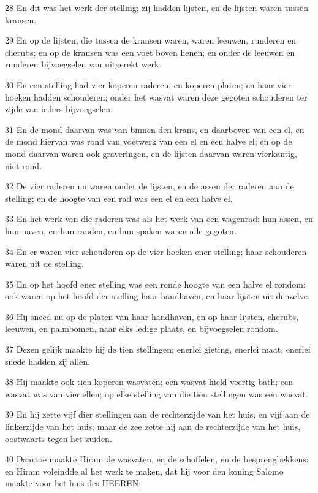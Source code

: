 \par 28 En dit was het werk der stelling; zij hadden lijsten, en de lijsten waren tussen kransen.
\par 29 En op de lijsten, die tussen de kransen waren, waren leeuwen, runderen en cherubs; en op de kransen was een voet boven henen; en onder de leeuwen en runderen bijvoegselen van uitgerekt werk.
\par 30 En een stelling had vier koperen raderen, en koperen platen; en haar vier hoeken hadden schouderen; onder het wasvat waren deze gegoten schouderen ter zijde van ieders bijvoegselen.
\par 31 En de mond daarvan was van binnen den krans, en daarboven van een el, en de mond hiervan was rond van voetwerk van een el en een halve el; en op de mond daarvan waren ook graveringen, en de lijsten daarvan waren vierkantig, niet rond.
\par 32 De vier raderen nu waren onder de lijsten, en de assen der raderen aan de stelling; en de hoogte van een rad was een el en een halve el.
\par 33 En het werk van die raderen was als het werk van een wagenrad; hun assen, en hun naven, en hun randen, en hun spaken waren alle gegoten.
\par 34 En er waren vier schouderen op de vier hoeken ener stelling; haar schouderen waren uit de stelling.
\par 35 En op het hoofd ener stelling was een ronde hoogte van een halve el rondom; ook waren op het hoofd der stelling haar handhaven, en haar lijsten uit denzelve.
\par 36 Hij sneed nu op de platen van haar handhaven, en op haar lijsten, cherubs, leeuwen, en palmbomen, naar elks ledige plaats, en bijvoegselen rondom.
\par 37 Dezen gelijk maakte hij de tien stellingen; enerlei gieting, enerlei maat, enerlei snede hadden zij allen.
\par 38 Hij maakte ook tien koperen wasvaten; een wasvat hield veertig bath; een wasvat was van vier ellen; op elke stelling van die tien stellingen was een wasvat.
\par 39 En hij zette vijf dier stellingen aan de rechterzijde van het huis, en vijf aan de linkerzijde van het huis; maar de zee zette hij aan de rechterzijde van het huis, oostwaarts tegen het zuiden.
\par 40 Daartoe maakte Hiram de wasvaten, en de schoffelen, en de besprengbekkens; en Hiram voleindde al het werk te maken, dat hij voor den koning Salomo maakte voor het huis des HEEREN;
